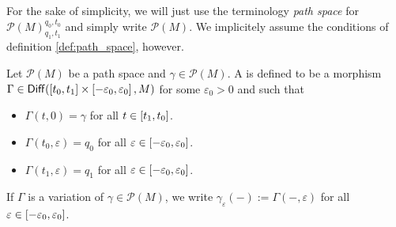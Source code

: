 \begin{remark}
	For the sake of simplicity, we will just use the terminology \emph{path space} for $\mathcal{P}(M)^{q_0,t_0}_{q_1,t_1}$ and simply write $\mathcal{P}(M)$. We implicitely assume the conditions of definition \ref{def:path_space}, however.
\end{remark}

\begin{definition}[Variation]
	\label{def:variation}
	Let $\mathcal{P}(M)$ be a path space and $\gamma \in \mathcal{P}(M)$. A  is defined to be a morphism $\Gamma \in \mathsf{Diff}(\intcc[0]{t_0,t_1} \times \intcc[0]{-\varepsilon_0,\varepsilon_0},M)$ for some $\varepsilon_0 > 0$ and such that
	\begin{itemize}[wide=0pt]
		\item $\Gamma(t,0) = \gamma$ for all $t \in \intcc[0]{t_1,t_0}$.
		\item $\Gamma(t_0,\varepsilon) = q_0$ for all $\varepsilon \in \intcc[0]{-\varepsilon_0,\varepsilon_0}$.
		\item $\Gamma(t_1,\varepsilon) = q_1$ for all $\varepsilon \in \intcc[0]{-\varepsilon_0,\varepsilon_0}$.
	\end{itemize}
\end{definition}

\begin{remark}
	If $\Gamma$ is a variation of $\gamma \in \mathcal{P}(M)$, we write $\gamma_\varepsilon(-) := \Gamma(-,\varepsilon)$ for all $\varepsilon \in \intcc[0]{-\varepsilon_0,\varepsilon_0}$.
\end{remark}

